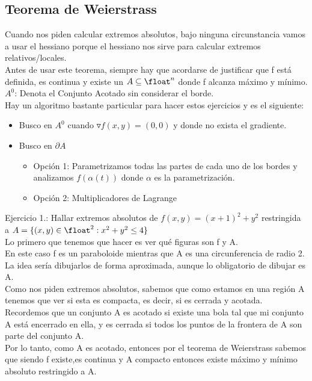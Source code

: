 \documentclass[10pt,a4paper]{article}
\begin{document}
\subsection*{Teorema de Weierstrass}
\label{subsec:teorema_weirstrass}
Cuando nos piden calcular extremos absolutos, bajo ninguna circunstancia vamos a usar el hessiano porque el hessiano nos sirve para calcular extremos relativos/locales. \\
Antes de usar este teorema, siempre hay que acordarse de justificar que f está definida, es continua y existe un $A \subseteq \float^{n}$ donde f alcanza máximo y mínimo. \\
\textbf{$A^{0}$}: Denota el Conjunto Acotado sin considerar el borde. \\
Hay un algoritmo bastante particular para hacer estos ejercicios y es el siguiente: 
\begin{itemize}
    \item Busco en $A^{0}$ cuando $\triangledown f(x,y) = (0,0)$ y donde no exista el gradiente. 
    \item Busco en $\partial A$
    \begin{itemize}
        \item Opción 1: Parametrizamos todas las partes de cada uno de los bordes y analizamos $f(\alpha(t)) $ donde $\alpha$ es la parametrización.
        \item Opción 2: Multiplicadores de Lagrange
    \end{itemize}
\end{itemize}
Ejercicio 1.: Hallar extremos absolutos de $f(x,y)=(x+1)^{2} + y^{2}$ restringida a $A = \{(x,y) \in \float^{2}:x^{2}+y^{2} \le 4\}$ \\
Lo primero que tenemos que hacer es ver qué figuras son f y A. \\
En este caso f es un paraboloide mientras que A es una circunferencia de radio 2. La idea sería dibujarlos de forma aproximada, aunque lo obligatorio de dibujar es A. \\
Como nos piden extremos absolutos, sabemos que como estamos en una región A tenemos que ver si esta es compacta, es decir, si es cerrada y acotada. \\
Recordemos que un conjunto A es acotado si existe una bola tal que mi conjunto A está encerrado en ella, y es cerrada si todos los puntos de la frontera de A son parte del conjunto A. \\
Por lo tanto, como A es acotado, entonces por el teorema de Weierstrass sabemos que siendo f existe,es continua y A compacto entonces existe máximo y mínimo absoluto restringido a A. 
\end{document}
